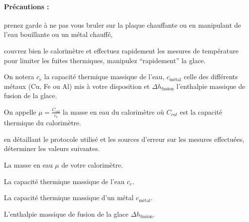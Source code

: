\paragraph{Précautions :}
\begin{list}{\Lightning}{}
\item prenez garde à ne pas vous bruler sur la plaque chauffante ou en manipulant de l'eau bouillante ou un métal chauffé,
\item couvrez bien le calorimètre et effectuez rapidement les mesures de température pour limiter les fuites thermiques, manipulez ``rapidement'' la glace.
\end{list}


\indications
\begin{list}{\textbullet}{}
\item On notera $c_{e}$ la capacité thermique massique de l'eau, $c_\text{métal}$ celle des différents métaux (Cu, Fe ou Al) mis à votre disposition
et $\Delta h_\text{fusion}$ l'enthalpie massique de fusion de la glace.
\item On appelle $\mu=\frac{C_{cal}}{c_{e}}$ la masse en eau du calorimètre où $C_{cal}$ est la capacité thermique du calorimètre.
\end{list}


\questions en détaillant le protocole utilisé et les sources d'erreur sur les mesures effectuées, déterminer les valeurs suivantes.
\begin{list}{\textbullet}{}
\item La masse en eau $\mu$ de votre calorimètre.
\item La capacité thermique massique de l'eau $c_{e}$.
\item La capacité thermique massique d'un métal $c_\text{métal}$.
\item L'enthalpie massique de fusion de la glace $\Delta h_\text{fusion}$.
\end{list}


\bigskip




\tdm





